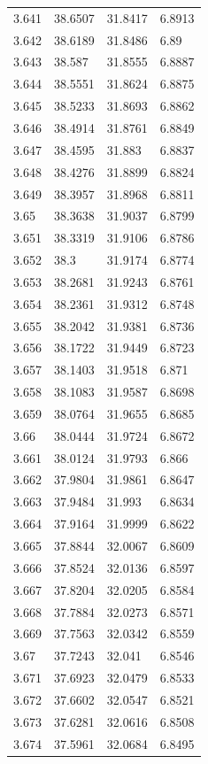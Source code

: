 \begin{tabular}{llll}
3.641 & 38.6507 & 31.8417 & 6.8913 \\
3.642 & 38.6189 & 31.8486 & 6.89 \\
3.643 & 38.587 & 31.8555 & 6.8887 \\
3.644 & 38.5551 & 31.8624 & 6.8875 \\
3.645 & 38.5233 & 31.8693 & 6.8862 \\
3.646 & 38.4914 & 31.8761 & 6.8849 \\
3.647 & 38.4595 & 31.883 & 6.8837 \\
3.648 & 38.4276 & 31.8899 & 6.8824 \\
3.649 & 38.3957 & 31.8968 & 6.8811 \\
3.65 & 38.3638 & 31.9037 & 6.8799 \\
3.651 & 38.3319 & 31.9106 & 6.8786 \\
3.652 & 38.3 & 31.9174 & 6.8774 \\
3.653 & 38.2681 & 31.9243 & 6.8761 \\
3.654 & 38.2361 & 31.9312 & 6.8748 \\
3.655 & 38.2042 & 31.9381 & 6.8736 \\
3.656 & 38.1722 & 31.9449 & 6.8723 \\
3.657 & 38.1403 & 31.9518 & 6.871 \\
3.658 & 38.1083 & 31.9587 & 6.8698 \\
3.659 & 38.0764 & 31.9655 & 6.8685 \\
3.66 & 38.0444 & 31.9724 & 6.8672 \\
3.661 & 38.0124 & 31.9793 & 6.866 \\
3.662 & 37.9804 & 31.9861 & 6.8647 \\
3.663 & 37.9484 & 31.993 & 6.8634 \\
3.664 & 37.9164 & 31.9999 & 6.8622 \\
3.665 & 37.8844 & 32.0067 & 6.8609 \\
3.666 & 37.8524 & 32.0136 & 6.8597 \\
3.667 & 37.8204 & 32.0205 & 6.8584 \\
3.668 & 37.7884 & 32.0273 & 6.8571 \\
3.669 & 37.7563 & 32.0342 & 6.8559 \\
3.67 & 37.7243 & 32.041 & 6.8546 \\
3.671 & 37.6923 & 32.0479 & 6.8533 \\
3.672 & 37.6602 & 32.0547 & 6.8521 \\
3.673 & 37.6281 & 32.0616 & 6.8508 \\
3.674 & 37.5961 & 32.0684 & 6.8495 \\

\end{tabular}
